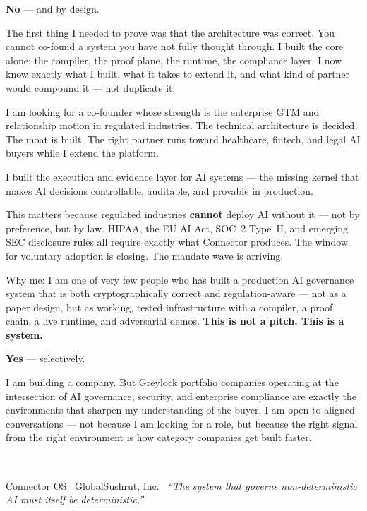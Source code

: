 \documentclass[10pt,a4paper]{article}
\newcommand{\qblock}[2]{%
  \vspace{8pt}
  \noindent
  \begin{tcolorbox}[qbase,
    colback=CSoft,
    title={\small\bfseries\color{CBlue} #1},
    attach boxed title to top left={yshift=-2mm,xshift=6pt},
    boxed title style={colback=CBlue,arc=2pt,boxrule=0pt,
      fonttitle=\small\bfseries\color{white}}]
  #2
  \end{tcolorbox}
}
\begin{document}
\qblock{Q6 — Do you have a co-founder already?}{

\textbf{No} — and by design.

The first thing I needed to prove was that the architecture was correct.
You cannot co-found a system you have not fully thought through.
I built the core alone: the compiler, the proof plane, the runtime, the compliance layer.
I now know exactly what I built, what it takes to extend it, and what kind of partner would
compound it — not duplicate it.

I am looking for a co-founder whose strength is the enterprise GTM and relationship motion
in regulated industries. The technical architecture is decided. The moat is built.
The right partner runs toward healthcare, fintech, and legal AI buyers while I extend the platform.

}

\qblock{Q7 — Anything else you'd like us to know}{

I built the execution and evidence layer for AI systems —
the missing kernel that makes AI decisions controllable, auditable, and provable in production.

\medskip
This matters because regulated industries \textbf{cannot} deploy AI without it —
not by preference, but by law.
HIPAA, the EU AI Act, SOC~2 Type~II, and emerging SEC disclosure rules all require
exactly what Connector produces.
The window for voluntary adoption is closing. The mandate wave is arriving.

\medskip
Why me: I am one of very few people who has built a production AI governance system that is both
cryptographically correct and regulation-aware — not as a paper design, but as working, tested
infrastructure with a compiler, a proof chain, a live runtime, and adversarial demos.
\textbf{This is not a pitch. This is a system.}

}

\qblock{Q8 — Interest in Greylock talent team}{

\textbf{Yes} — selectively.

I am building a company. But Greylock portfolio companies operating at the intersection of
AI governance, security, and enterprise compliance are exactly the environments that sharpen
my understanding of the buyer. I am open to aligned conversations —
not because I am looking for a role, but because the right signal from the right environment
is how category companies get built faster.

}

\vspace{8pt}
\noindent\textcolor{CLine}{\rule{\linewidth}{0.5pt}}\\[3pt]
{\footnotesize\color{CGray}\centering
  Connector OS \textbullet\ GlobalSushrut, Inc. \textbullet\
  \textit{``The system that governs non-deterministic AI must itself be deterministic.''}
}
\end{document}
